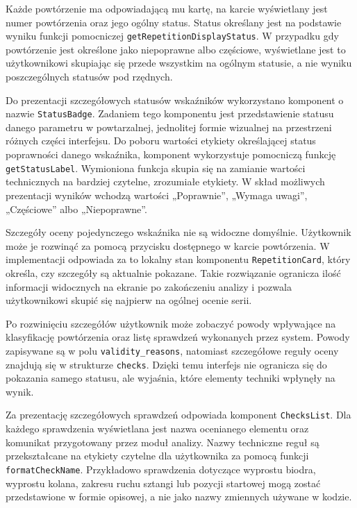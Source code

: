 Każde powtórzenie ma odpowiadającą mu kartę, na karcie wyświetlany jest numer powtórzenia oraz jego ogólny status. Status określany jest na podstawie wyniku funkcji pomocniczej \texttt{getRepetitionDisplayStatus}. W przypadku gdy powtórzenie jest określone jako niepoprawne albo częściowe, wyświetlane jest to użytkownikowi skupiając się przede wszystkim na ogólnym statusie, a nie wyniku poszczególnych statusów pod rzędnych.

Do prezentacji szczegółowych statusów wskaźników wykorzystano komponent o nazwie \texttt{StatusBadge}. Zadaniem tego komponentu jest przedstawienie statusu danego parametru w powtarzalnej, jednolitej formie wizualnej na przestrzeni różnych części interfejsu. Do poboru wartości etykiety określającej status poprawności danego wskaźnika, komponent wykorzystuje pomocniczą funkcję  \texttt{getStatusLabel}. Wymioniona funkcja skupia się na zamianie wartości technicznych na bardziej czytelne, zrozumiałe etykiety. W skład możliwych prezentacji wyników wchodzą wartości „Poprawnie”, „Wymaga uwagi”, „Częściowe” albo „Niepoprawne”. 

Szczegóły oceny pojedynczego wskaźnika nie są widoczne domyślnie. Użytkownik może je rozwinąć za pomocą przycisku dostępnego w karcie powtórzenia. W implementacji odpowiada za to lokalny stan komponentu \texttt{RepetitionCard}, który określa, czy szczegóły są aktualnie pokazane. Takie rozwiązanie ogranicza ilość informacji widocznych na ekranie po zakończeniu analizy i pozwala użytkownikowi skupić się najpierw na ogólnej ocenie serii.

Po rozwinięciu szczegółów użytkownik może zobaczyć powody wpływające na klasyfikację powtórzenia oraz listę sprawdzeń wykonanych przez system. Powody zapisywane są w polu \texttt{validity\_reasons}, natomiast szczegółowe reguły oceny znajdują się w strukturze \texttt{checks}. Dzięki temu interfejs nie ogranicza się do pokazania samego statusu, ale wyjaśnia, które elementy techniki wpłynęły na wynik.

Za prezentację szczegółowych sprawdzeń odpowiada komponent \texttt{ChecksList}. Dla każdego sprawdzenia wyświetlana jest nazwa ocenianego elementu oraz komunikat przygotowany przez moduł analizy. Nazwy techniczne reguł są przekształcane na etykiety czytelne dla użytkownika za pomocą funkcji \texttt{formatCheckName}. Przykładowo sprawdzenia dotyczące wyprostu biodra, wyprostu kolana, zakresu ruchu sztangi lub pozycji startowej mogą zostać przedstawione w formie opisowej, a nie jako nazwy zmiennych używane w kodzie.

